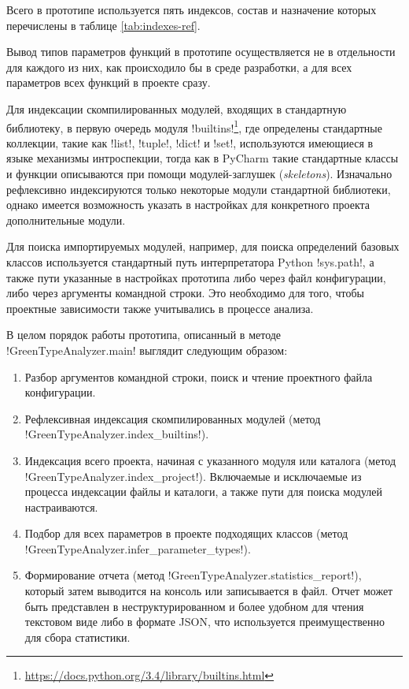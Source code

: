 Всего в прототипе используется пять индексов, состав и назначение которых
перечислены в таблице \ref{tab:indexes-ref}.

Вывод типов параметров функций в прототипе осуществляется не в отдельности для
каждого из них, как происходило бы в среде разработки, а для всех параметров
всех функций в проекте сразу.


Для индексации скомпилированных модулей, входящих в стандартную библиотеку, в
первую очередь модуля
!builtins!\footnote{\url{https://docs.python.org/3.4/library/builtins.html}},
где определены стандартные коллекции, такие как !list!, !tuple!, !dict! и !set!,
используются имеющиеся в языке механизмы интроспекции, тогда как в PyCharm
такие стандартные классы и функции описываются при помощи модулей-заглушек
(\emph{skeletons}).
Изначально рефлексивно индексируются только некоторые модули стандартной
библиотеки, однако имеется возможность указать в настройках для конкретного
проекта дополнительные модули.

Для поиска импортируемых модулей, например, для поиска определений базовых
классов используется стандартный путь интерпретатора Python !sys.path!, а также пути
указанные в настройках прототипа либо через файл конфигурации, либо через
аргументы командной строки. Это необходимо для того, чтобы проектные
зависимости также учитывались в процессе анализа.

В целом порядок работы прототипа, описанный в методе !GreenTypeAnalyzer.main! 
выглядит следующим образом:

\begin{enumerate}
    \item Разбор аргументов командной строки, поиск и чтение проектного файла
      конфигурации.

    \item Рефлексивная индексация скомпилированных модулей (метод
      !GreenTypeAnalyzer.index_builtins!).

    \item Индексация всего проекта, начиная с указанного модуля или каталога 
      (метод !GreenTypeAnalyzer.index_project!).
      Включаемые и исключаемые из процесса индексации файлы и каталоги, а также
      пути для поиска модулей настраиваются. 

    \item Подбор для всех параметров в проекте подходящих классов (метод
      !GreenTypeAnalyzer.infer_parameter_types!).

    \item Формирование отчета (метод !GreenTypeAnalyzer.statistics_report!),
      который затем выводится на консоль или записывается в файл. Отчет может
      быть представлен в неструктурированном и более удобном для чтения
      текстовом виде либо в формате JSON, что используется преимущественно для
      сбора статистики. 

\end{enumerate}

